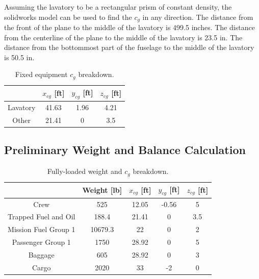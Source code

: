 \documentclass[conf]{new-aiaa}
\begin{document}
Assuming the lavatory to be a rectangular prism of constant density, the solidworks model can be used to find the $c_g$ in any direction. The distance from the front of the plane to the middle of the lavatory is 499.5 inches. The distance from the centerline of the plane to the middle of the lavatory is 23.5 in. The distance from the bottommost part of the fuselage to the middle of the lavatory is 50.5 in.

\begin{table}[H]
\centering
\label{tab:Fixed equipment cg}
\caption{Fixed equipment $c_g$ breakdown.}
\begin{tabular}{|c|c|c|c|}\hline
	& $x_{cg}$ [ft] & $y_{cg}$ [ft] & $z_{cg}$ [ft] \\ \hline
Lavatory & 41.63 & 1.96 & 4.21\\ \hline
Other & 21.41 & 0 & 3.5\\ \hline

\end{tabular}
\end{table}


\subsection{Preliminary Weight and Balance Calculation}

\begin{table}[H]
\centering
\label{tab:weight and cg fully loaded}
\caption{Fully-loaded weight and $c_g$ breakdown.}
\begin{tabular}{|c|c|c|c|c|}\hline
						& Weight [lb] & $x_{cg}$ [ft] & $y_{cg}$ [ft] & $z_{cg}$ [ft]\\ \hline
Crew 					& 525 & 12.05 & -0.56 & 5\\ \hline
Trapped Fuel and Oil 	& 188.4 & 21.41 & 0 & 3.5\\ \hline
Mission Fuel Group 1 	& 10679.3 & 22 & 0 & 2\\ \hline
Passenger Group 1 		& 1750 & 28.92 & 0 & 5\\ \hline
Baggage 				& 605 & 28.92 & 0 & 3\\ \hline
Cargo 					& 2020 & 33 & -2 & 0\\ \hline

\end{tabular}

\end{table}
\end{document}
